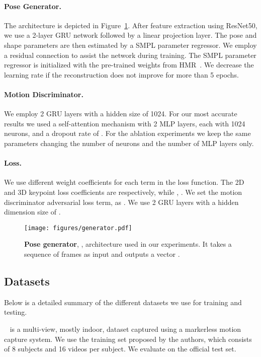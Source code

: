 \documentclass[10pt,twocolumn,letterpaper]{article}
\begin{document}
\paragraph{Pose Generator.} The architecture is depicted in Figure~\ref{fig:generator}. After feature extraction using ResNet50, we use a 2-layer GRU network followed by a linear projection layer. The pose and shape parameters are then estimated by a SMPL parameter regressor. We employ a residual connection to assist the network during training. The SMPL parameter regressor is initialized with the pre-trained weights from HMR~\cite{kanazawa_hmr,SPIN:ICCV:2019}. We decrease the learning rate if the reconstruction does not improve for more than 5 epochs.


\paragraph{Motion Discriminator.} We employ 2 GRU layers with a hidden size of 1024. For our most accurate results we used a self-attention mechanism with 2 MLP layers, each with 1024 neurons, and a dropout rate of . For the ablation experiments we keep the same parameters changing the number of neurons and the number of MLP layers only. 

\paragraph{Loss.} We use different weight coefficients for each term in the loss function. The 2D and 3D keypoint loss coefficients are  respectively, while , . We set the motion discriminator adversarial loss term,  as . We use 2 GRU layers with a hidden dimension size of . 





\begin{figure}[h]
	\centering    
	\texttt{[image: figures/generator.pdf]}
	\caption{\textbf{Pose generator}, , architecture used in our experiments. It takes a sequence of frames as input and outputs a vector .}
	\label{fig:generator}
\end{figure}

\subsection{Datasets}
Below is a detailed summary of the different datasets we use for training and testing.

\vspace{0.1in}
~\cite{mpiiinf3dhp_mono-2017} is a multi-view, mostly indoor, dataset captured using a markerless motion capture system. We use the  training set proposed by the authors, which consists of 8 subjects and 16 videos per subject. We evaluate on the official test set. 
\end{document}
